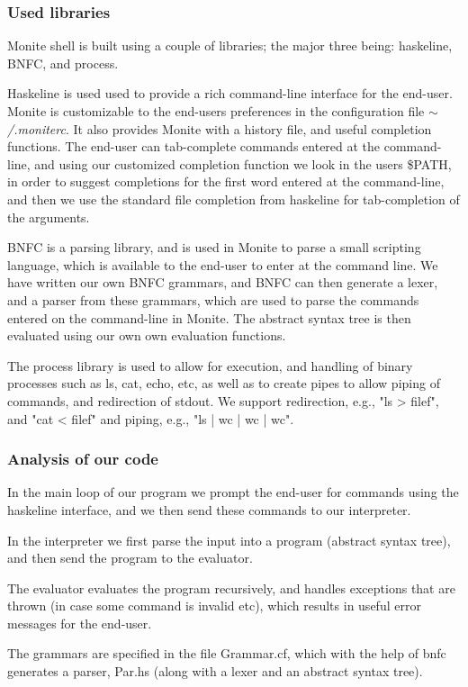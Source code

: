 \documentclass[11pt,a4paper]{article}
\begin{document}
\subsubsection{Used libraries}

Monite shell is built using a couple
of libraries; the major three being: haskeline, BNFC, and process.

Haskeline is used used to provide a rich command-line interface for the
end-user. Monite is customizable to the end-users preferences in the
configuration file $\mathtt{\sim}$\textit{/.moniterc}. It also provides Monite
with a history file, and useful completion functions. The end-user can
tab-complete commands entered at the command-line, and using our customized
completion function we look in the users \$PATH, in order to suggest completions
for the first word entered at the command-line, and then we use the standard
file completion from haskeline for tab-completion of the arguments.

BNFC is a parsing library, and is used in Monite to parse a small scripting
language, which is available to the end-user to enter at the command line. We
have written our own BNFC grammars, and BNFC can then generate a lexer, and a
parser from these grammars, which are used to parse the commands entered on the
command-line in Monite. The abstract syntax tree is then evaluated using our own
own evaluation functions.

The process library is used to allow for execution, and handling of binary
processes such as ls, cat, echo, etc, as well as to create pipes to allow
piping of commands, and redirection of stdout. We support redirection, e.g.,
"ls > filef", and "cat < filef" and piping, e.g., "ls | wc | wc | wc".

\subsubsection{Analysis of our code}
In the main loop of our program we prompt the end-user for commands using the
haskeline interface, and we then send these commands to our interpreter.

In the interpreter we first parse the input into a program (abstract syntax
tree), and then send the program to the evaluator.

The evaluator evaluates the program recursively, and handles exceptions that are
thrown (in case some command is invalid etc), which results in useful error
messages for the end-user.

The grammars are specified in the file Grammar.cf, which with the help of bnfc
generates a parser, Par.hs (along with a lexer and an abstract syntax tree).
\end{document}
